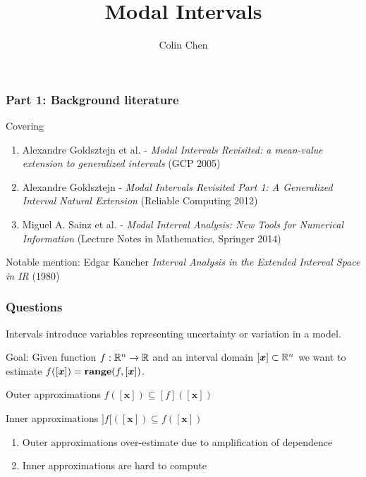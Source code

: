 \documentclass{beamer}
\title{Modal Intervals}
\author{Colin Chen}
\begin{document}
\begin{frame}
    \titlepage
\end{frame}

\begin{frame}
    \frametitle{Part 1: Background literature}

    Covering
    \begin{enumerate}
        \item Alexandre Goldsztejn et al. - \textit{Modal Intervals Revisited: a mean-value extension to generalized intervals} (GCP 2005)
        \item Alexandre Goldsztejn - \textit{Modal Intervals Revisited Part 1: A Generalized Interval Natural Extension} (Reliable Computing 2012)
        \item Miguel A. Sainz et al. - \textit{Modal Interval Analysis: New Tools for Numerical Information} (Lecture Notes in Mathematics, Springer 2014)
    \end{enumerate}
    
    Notable mention: Edgar Kaucher \textit{Interval Analysis in the Extended Interval Space in IR} (1980)

\end{frame}


\begin{frame}
    \frametitle{Questions}

    Intervals introduce variables representing uncertainty or variation in a model.

    Goal:
    Given function $f: \mathbb R^n \rightarrow \mathbb R$ and an interval domain $[\bm{x}] \subset \mathbb R^n$ we want to estimate $f([\bm{x}]) = \textbf{range}(f, [\bm{x}])$.
    \par Outer approximations \; $f([\bm{x}]) \subseteq [f]([\bm{x}])$
    \par Inner approximations \; $]f[([\bm{x}]) \subseteq f([\bm{x}])$

    \begin{enumerate}
        \item Outer approximations over-estimate due to amplification of dependence
        \item Inner approximations are hard to compute
    \end{enumerate}

\end{frame}
\end{document}
